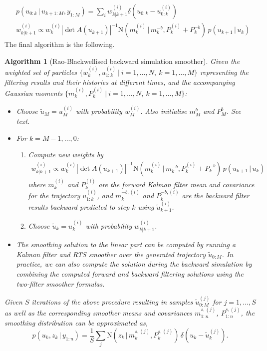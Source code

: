 \documentclass[twocolumn]{autart}    %
\newtheorem{algo}{Algorithm}[section]
\begin{document}
%
%
\begin{equation}
\begin{split}
  &p(u_{0:k}\,|\,u_{k+1:M},y_{1:M}) = \sum_i w_{k|k+1}^{(i)} \delta(u_{0:k} - u^{(i)}_{0:k}) \\
  &w_{k|k+1}^{(i)} \propto w^{(i)}_k |\det A(u_{k+1})|^{-1} \mathrm{N}(m_k^{(i)}\,|\,m^{-b}_{k},P_k^{(i)}+P^{-b}_{k}) \, p(u_{k+1}\,|\,u_{k})
\end{split}
\label{eq:rbbacksimeq}
\end{equation}
%
The final algorithm is the following.
%
\begin{algo}[Rao-Blackwellised backward simulation smoother]
  \label{alg:rbbssmooth}
  Given the weighted set of particles $\{ w_k^{(i)}, u_{1:k}^{(i)} ~|~ i=1,\ldots,N,~k=1,\ldots,M \}$ representing the filtering results and their histories at different times, and the accompanying Gaussian moments $\{ m_k^{(i)}, P_k^{(i)} ~|~ i=1,\ldots,N,~k=1,\ldots,M \}$:
\begin{itemize}
\item Choose $\tilde{u}_M = u_M^{(i)}$ with probability $w^{(i)}_{M}$. Also initialise $m_M^b$ and $P_M^b$. See text.
\item For $k=M-1,\ldots,0$:
\begin{enumerate}
  \item Compute new weights by
    \begin{equation}
      \begin{split}
        w_{k|k+1}^{(i)} \propto w^{(i)}_k |\det A(u_{k+1})|^{-1} \mathrm{N}(m_k^{(i)}\,|\,m^{-b}_{k},P_k^{(i)}+P^{-b}_{k}) \, p(u_{k+1}\,|\,u_{k})
     \end{split}
    \end{equation}
    where $m^{(i)}_k$ and $P^{(i)}_k$ are the forward Kalman filter mean and covariance for the trajectory $u_{1:k}^{(i)}$, and     $m^{-b,(i)}_{k}$ and $P^{-b,(i)}_{k}$ are the backward filter  results backward predicted to step $k$ using $\tilde{u}_{k+1}^{(i)}$. \item Choose $\tilde{u}_k = u_k^{(i)}$ with probability $w^{(i)}_{k|k+1}$.
  \end{enumerate}
\item The smoothing solution to the linear part can be computed by running a Kalman filter and RTS smoother over the generated trajectory $\tilde{u}_{0:M}$. In practice, we can also compute the solution during the backward simulation by combining the computed forward and backward filtering solutions using the two-filter smoother formulas.
\end{itemize}
%
Given $S$ iterations of the above procedure resulting in samples $\tilde{u}_{0:M}^{(j)}$ for $j=1,\ldots,S$ as well as the corresponding smoother means and covariances $m^{s,(j)}_{1:n}$, $P^{s,(j)}_{1:n}$, the smoothing distribution can be approximated as,
%
\begin{equation}
  p(u_k,z_k\,|\,y_{1:n})
  = \frac{1}{S} \sum_j \mathrm{N}(z_k\,|\,m_k^{s,(j)},P_k^{s,(j)}) \,
  \delta(u_k - \tilde{u}_k^{(j)}).
\nonumber
\end{equation}
\end{algo}
\end{document}
